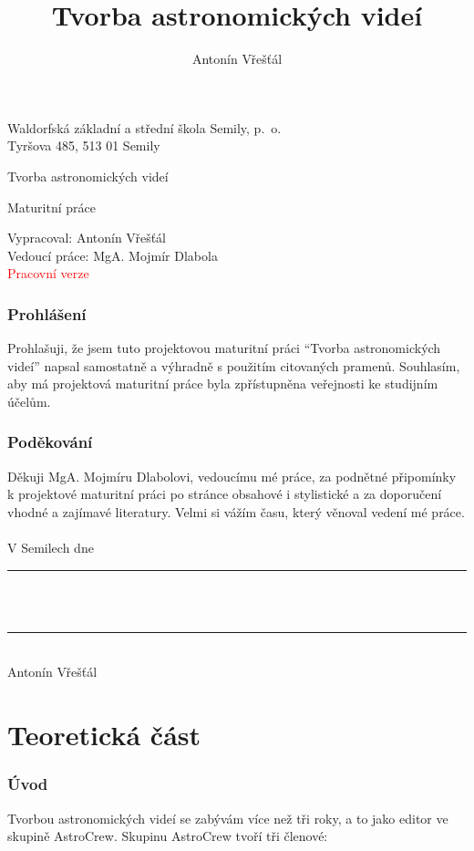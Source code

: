 \documentclass[12pt,a4paper,titlepage]{article}
\author{Antonín Vřešťál}
\title{Tvorba astronomických videí}
\begin{document}
\begin{titlepage}
	\begin{center}
		Waldorfská základní a střední škola Semily, p.\  o.\\
		Tyršova 485, 513 01 Semily
		\vspace*{1cm}
 
		\vfill		

		\Huge
		Tvorba astronomických videí
 
		\normalsize
		\vspace{0.5cm}
		Maturitní práce 	 
		 
		\vfill		
	\end{center}
	Vypracoval: Antonín Vřešťál\\
	Vedoucí práce: MgA. Mojmír Dlabola\\
	\textcolor{red}{Pracovní verze}\\
 \end{titlepage}
\newpage
\section*{Prohlášení}
Prohlašuji, že jsem tuto projektovou maturitní práci \enquote{Tvorba astronomických videí} napsal samostatně a výhradně s použitím citovaných pramenů. Souhlasím, aby má projektová maturitní práce byla zpřístupněna veřejnosti ke studijním účelům.
\section*{Poděkování}
Děkuji MgA. Mojmíru Dlabolovi, vedoucímu mé práce, za podnětné připomínky k projektové maturitní práci po stránce obsahové i stylistické a za doporučení vhodné a zajímavé literatury. Velmi si vážím času, který věnoval vedení mé práce.\\
\\
V Semilech dne \hspace{0.05cm} \rule[-3pt]{1.5in}{0.5pt}\\
\\
\hspace{0.5cm} \rule[-3pt]{5.5cm}{0.5pt}\\
\indent \indent Antonín Vřešťál\\

\newpage
\tableofcontents
\newpage
\part{Teoretická část}
\section{Úvod}
Tvorbou astronomických videí se zabývám více než tři roky, a to jako editor ve skupině AstroCrew. Skupinu AstroCrew tvoří tři členové:
\end{document}
